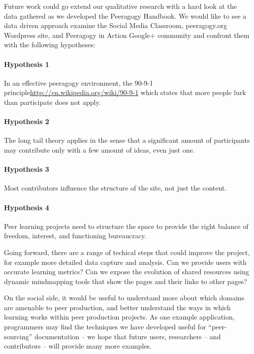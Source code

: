 \documentclass{acm_proc_article-sp}
\begin{document}
Future work could go extend our qualitative research with a hard look
at the data gathered as we developed the Peeragogy Handbook. We would
like to see a data driven approach examine the Social Media Classroom,
peeragogy.org Wordpress site, and Peeragogy in Action Google+
community and confront them with the following hypotheses:

\paragraph{Hypothesis 1}
In an effective peeragogy environment, the 90-9-1 principle\url{http://en.wikipedia.org/wiki/90-9-1} which
states that more people lurk than participate does not apply.

\paragraph{Hypothesis 2}
The long tail theory applies in the sense that a significant amount of
participants may contribute only with a few amount of ideas, even just
one.

\paragraph{Hypothesis 3}
Most contributors influence the structure of the site, not just the
content.

\paragraph{Hypothesis 4}
Peer learning projects need to structure the space to provide the
right balance of freedom, interest, and functioning bureaucracy.

Going forward, there are a range of techical steps that could improve
the project, for example more detailed data capture and analysis. Can
we provide users with accurate learning metrics? Can we expose the
evolution of shared resources using dynamic mindmapping tools that
show the pages and their links to other pages?

On the social side, it would be useful to understand more about which
domains are amenable to peer production, and better understand the
ways in which learning works within peer production projects.  As one
example application, programmers may find the techniques we have
developed useful for ``peer-sourcing'' documentation -- we hope that
future users, researchers -- and contributors -- will provide many
more examples.
\end{document}
